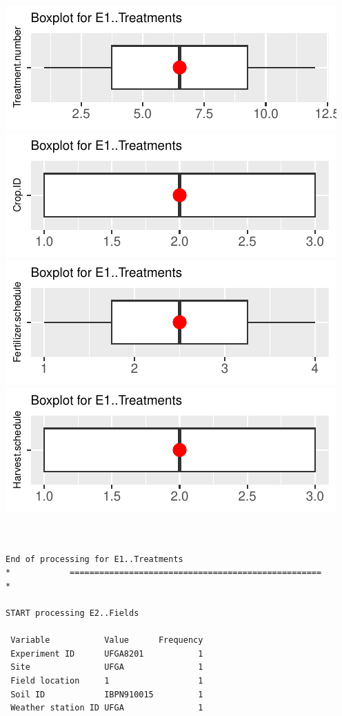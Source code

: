 \documentclass[
]{article}
\begin{document}
\includegraphics{FL_Crop_BMP_QA_single_dataset_files/figure-latex/check-content-of-sheets-1.pdf}
\includegraphics{FL_Crop_BMP_QA_single_dataset_files/figure-latex/check-content-of-sheets-2.pdf}
\includegraphics{FL_Crop_BMP_QA_single_dataset_files/figure-latex/check-content-of-sheets-3.pdf}
\includegraphics{FL_Crop_BMP_QA_single_dataset_files/figure-latex/check-content-of-sheets-4.pdf}

\begin{verbatim}


End of processing for E1..Treatments
*            ===================================================            *

START processing E2..Fields

 Variable           Value      Frequency
 Experiment ID      UFGA8201           1
 Site               UFGA               1
 Field location     1                  1
 Soil ID            IBPN910015         1
 Weather station ID UFGA               1
\end{verbatim}
\end{document}
